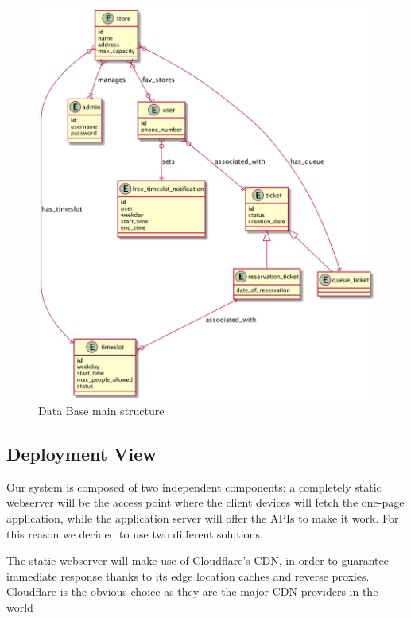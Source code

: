 \begin{figure}[H]
    \includegraphics[width=\linewidth]{uml/db_structure.png}
    \caption{Data Base main structure}
    \label{fig:db_structure}
\end{figure}




\subsection{Deployment View}
Our system is composed of two independent components: a completely static webserver will be the access point where the client devices will fetch the one-page application, while the application server will offer the APIs to make it work.
For this reason we decided to use two different solutions.

The static webserver will make use of Cloudflare's CDN, in order to guarantee immediate response thanks to its edge location caches and reverse proxies. Cloudflare is the obvious choice as they are the major CDN providers in the world

